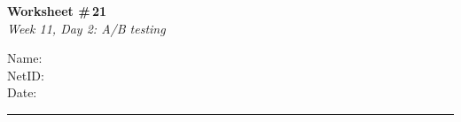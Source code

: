 \documentclass[11pt]{article}
\begin{document}
\noindent
\begin{minipage}[t]{0.55\textwidth}
  \vspace{0pt}
  {\LARGE \textbf{Worksheet \#\,21}} \\[0.3em]
  {\large \textit{Week 11, Day 2: A/B testing}}
\end{minipage}
\hfill
\begin{minipage}[t]{0.40\textwidth}
  \vspace{0pt}
  \begin{mdframed}[linecolor=black, linewidth=1pt, innertopmargin=10pt, innerbottommargin=10pt]
    \small
    \vspace{0.4cm}
    Name: \underline{\hspace{4.5cm}} \\[1em]
    NetID: \underline{\hspace{4.3cm}} \\[1em]
    Date: \underline{\hspace{4.4cm}} \\
  \end{mdframed}
\end{minipage}

\vspace{1em}
\noindent\rule{\linewidth}{1pt}
\vspace{0.2em}
\end{document}
